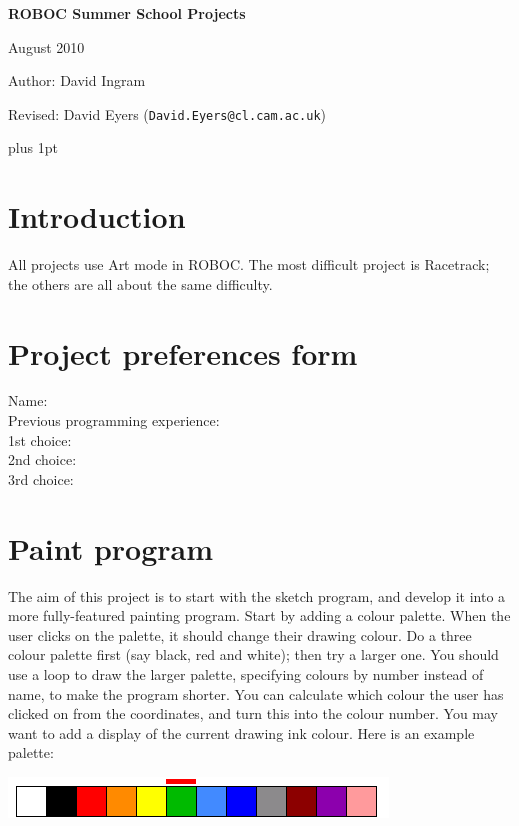 \documentclass[12pt,a4paper,twoside]{article}
\renewcommand{\_}{\texttt{\symbol{95}}}
\begin{document}
\centerline{\textbf{\LARGE ROBOC Summer School Projects}}
\vspace{0.5cm}
\centerline{August 2010}
\centerline{Author: David Ingram}
\centerline{Revised: David Eyers (\texttt{David.Eyers@cl.cam.ac.uk})}

{ \parskip 1mm plus 1pt \tableofcontents }

\section*{Introduction}

All projects use Art mode in ROBOC.
The most difficult project is Racetrack; the others are all about
the same difficulty.

\newpage
\section*{Project preferences form}

{\Large
Name:\\[1mm]

Previous programming experience:\\[10mm]

1st choice:\\[1mm]

2nd choice:\\[1mm]

3rd choice:\\[1mm]
}
\newpage
\section{Paint program}

The aim of this project is to start with the sketch program, and
develop it into a more fully-featured painting program. Start by
adding a colour palette. When the user clicks on the palette, it
should change their drawing colour. Do a three colour palette
first (say black, red and white); then try a larger one. You
should use a loop to draw the larger palette, specifying colours
by number instead of name, to make the program shorter. You can
calculate which colour the user has clicked on from the coordinates,
and turn this into the colour number. You may want to add a display
of the current drawing ink colour. Here is an example palette:

\begin{center}
\includegraphics[scale=0.6,angle=0]{screenshots/artpixel/paint/palette}
\end{center}
\end{document}
